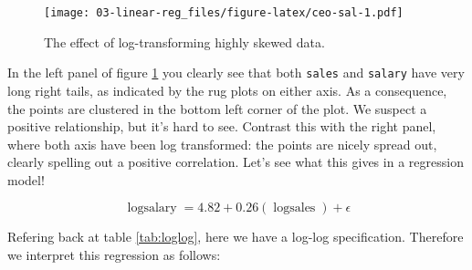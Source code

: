 \documentclass[]{book}
\newenvironment{Shaded}{\begin{snugshade}}{\end{snugshade}}
\newcommand{\KeywordTok}[1]{\textcolor[rgb]{0.13,0.29,0.53}{\textbf{#1}}}
\newcommand{\DataTypeTok}[1]{\textcolor[rgb]{0.13,0.29,0.53}{#1}}
\newcommand{\DecValTok}[1]{\textcolor[rgb]{0.00,0.00,0.81}{#1}}
\newcommand{\StringTok}[1]{\textcolor[rgb]{0.31,0.60,0.02}{#1}}
\newcommand{\OtherTok}[1]{\textcolor[rgb]{0.56,0.35,0.01}{#1}}
\newcommand{\OperatorTok}[1]{\textcolor[rgb]{0.81,0.36,0.00}{\textbf{#1}}}
\newcommand{\NormalTok}[1]{#1}
\begin{document}
\begin{Shaded}
\end{Shaded}

\begin{figure}
\centering
\texttt{[image: 03-linear-reg\_files/figure-latex/ceo-sal-1.pdf]}
\caption{\label{fig:ceo-sal}The effect of log-transforming highly skewed
data.}
\end{figure}

In the left panel of figure \ref{fig:ceo-sal} you clearly see that both
\texttt{sales} and \texttt{salary} have very long right tails, as
indicated by the rug plots on either axis. As a consequence, the points
are clustered in the bottom left corner of the plot. We suspect a
positive relationship, but it's hard to see. Contrast this with the
right panel, where both axis have been log transformed: the points are
nicely spread out, clearly spelling out a positive correlation. Let's
see what this gives in a regression model!

\[
\operatorname{logsalary} = 4.82 + 0.26(\operatorname{logsales}) + \epsilon
\]

Refering back at table \ref{tab:loglog}, here we have a log-log
specification. Therefore we interpret this regression as follows:
\end{document}
